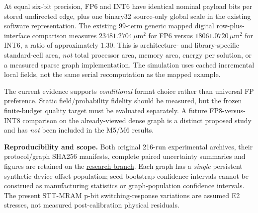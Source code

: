 At equal six-bit precision, FP6 and INT6 have identical
nominal payload bits per stored undirected edge, plus
one binary32 source-only global scale in the existing
software representation. The existing 99-term generic
mapped digital row-plus-interface comparison
measures $23481.2704\,\mu\mathrm{m}^2$ for FP6
versus $18061.0720\,\mu\mathrm{m}^2$ for INT6,
a ratio of approximately $1.30$. This is
architecture- and library-specific standard-cell
area, \emph{not} total processor area, memory
area, energy per solution, or a measured sparse
graph implementation. The simulation uses cached
incremental local fields, not the same serial
recomputation as the mapped example.

The current evidence supports \emph{conditional}
format choice rather than universal FP preference.
Static field/probability fidelity should be measured,
but the frozen finite-budget quality target must be
evaluated separately. A future FP8-versus-INT8
comparison on the already-viewed dense graph is
a distinct proposed study and has \emph{not}
been included in the M5/M6 results.

\noindent\textbf{Reproducibility and scope.}
Both original 216-run experimental archives,
their protocol/graph SHA256 manifests, complete
paired uncertainty summaries and figures are
retained on the \href{https://github.com/Makise-okabe/MRAM_P-bit/tree/research/m4-gain-fusion-20261107/results}{research branch}.
Each graph has a \emph{single} persistent synthetic
device-offset population; seed-bootstrap confidence
intervals cannot be construed as manufacturing
statistics or graph-population confidence intervals.
The present STT-MRAM p-bit switching-response
variations are assumed E2 stresses, not measured
post-calibration physical residuals.

